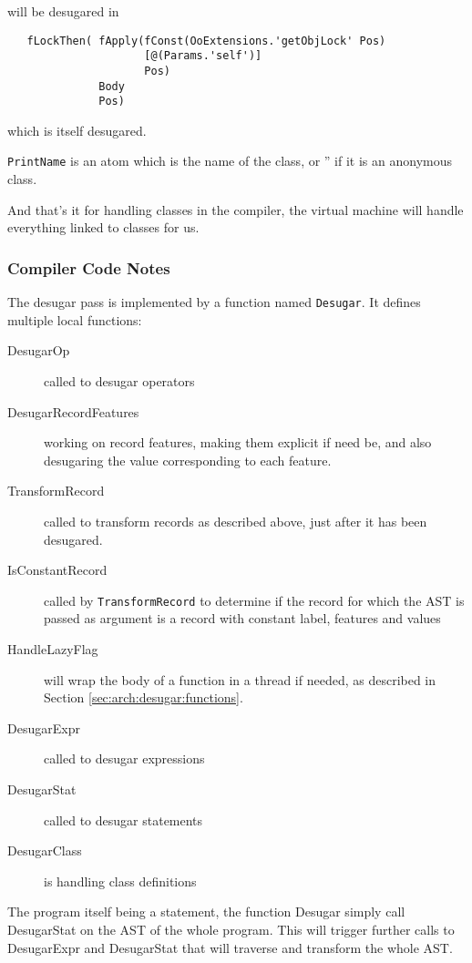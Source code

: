 \documentclass[a4paper]{memoir}
\begin{document}
will be desugared in 

\begin{lstlisting}
   fLockThen( fApply(fConst(OoExtensions.'getObjLock' Pos) 
                     [@(Params.'self')] 
                     Pos)
              Body 
              Pos)  
\end{lstlisting}
which is itself desugared.

\lstinline!PrintName! is an atom which is the name of the class, or '' if it is
an anonymous class.

And that's it for handling classes in the compiler, the virtual machine will
handle everything linked to classes for us.

\subsubsection{Compiler Code Notes}
The desugar pass is implemented by a function named \lstinline!Desugar!. It defines multiple local functions:
\begin{description}
  \item[DesugarOp] called to desugar operators
  \item[DesugarRecordFeatures] working on record features, making them explicit if need be, and also desugaring the value corresponding to each feature.
  \item[TransformRecord] called to transform records as described above, just after it has been desugared.
  \item[IsConstantRecord] called by \lstinline!TransformRecord! to determine if the record for which the AST is passed as argument is a record with constant label, features and values
  \item[HandleLazyFlag] will wrap the body of a function in a thread if needed, as described in Section \ref{sec:arch:desugar:functions}.
  \item[DesugarExpr] called to desugar expressions
  \item[DesugarStat] called to desugar statements
  \item[DesugarClass] is handling class definitions 
\end{description}

The program itself being a statement, the function Desugar simply call DesugarStat on the AST of the whole program. This will trigger further calls to DesugarExpr and DesugarStat that will traverse and transform the whole AST.
\end{document}
